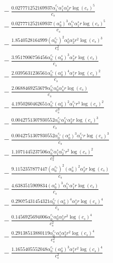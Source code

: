 \documentclass[10pt]{article}
\begin{document}
\begin{align*}
&{}  - \frac{0.027771252169937 \alpha_{1}^{c_s} \alpha_{1}^s \alpha_{2}^s r \log{\left(c_{s} \right)}^{5}}{c_{s}} \\
&{}  - \frac{0.027771252169937 \left(\alpha_{0}^s\right)^{3} \alpha_{1}^{c_s} \alpha_{1}^s r \log{\left(c_{s} \right)}^{5}}{c_{s}} \\
&{}  - \frac{1.8540528164999 \left(\alpha_{0}^{c_s}\right)^{2} \alpha_{0}^s \alpha_{2}^s r^{2} \log{\left(c_{s} \right)}^{3}}{c_{s}^{2}} \\
&{}  - \frac{3.9517006756456 \alpha_{0}^{c_s} \left(\alpha_{0}^s\right)^{3} \alpha_{2}^s r \log{\left(c_{s} \right)}}{c_{s}} \\
&{}  - \frac{2.0395631236561 \alpha_{0}^{c_s} \left(\alpha_{0}^s\right)^{4} \alpha_{1}^s r \log{\left(c_{s} \right)}^{2}}{c_{s}} \\
&{}  - \frac{2.0688469253679 \alpha_{0}^{c_s} \alpha_{0}^s \alpha_{4}^s r \log{\left(c_{s} \right)}}{c_{s}} \\
&{}  - \frac{4.1950260462651 \alpha_{0}^{c_s} \left(\alpha_{0}^s\right)^{2} \alpha_{1}^{c_s} r^{3} \log{\left(c_{s} \right)}^{2}}{c_{s}^{3}} \\
&{}  - \frac{0.0042751307930552 \alpha_{0}^{c_s} \alpha_{2}^{c_s} \alpha_{2}^s r \log{\left(c_{s} \right)}^{3}}{c_{s}} \\
&{}  - \frac{0.0042751307930552 \alpha_{0}^{c_s} \left(\alpha_{0}^s\right)^{3} \alpha_{2}^{c_s} r \log{\left(c_{s} \right)}^{3}}{c_{s}} \\
&{}  - \frac{1.1071445237506 \alpha_{0}^{c_s} \alpha_{1}^s \alpha_{2}^{c_s} r^{2} \log{\left(c_{s} \right)}^{2}}{c_{s}^{2}} \\
&{}  - \frac{9.1152357877447 \left(\alpha_{0}^{c_s}\right)^{2} \left(\alpha_{0}^s\right)^{2} \alpha_{2}^s r \log{\left(c_{s} \right)}}{c_{s}} \\
&{}  - \frac{4.6383515909834 \left(\alpha_{0}^s\right)^{3} \alpha_{1}^{c_s} \alpha_{1}^s r \log{\left(c_{s} \right)}}{c_{s}} \\
&{}  - \frac{0.29075431454321 \alpha_{0}^{c_s} \left(\alpha_{0}^s\right)^{4} \alpha_{1}^s r \log{\left(c_{s} \right)}^{4}}{c_{s}} \\
&{}  - \frac{0.1456925694006 \alpha_{0}^{c_s} \alpha_{0}^s \alpha_{3}^s r^{2} \log{\left(c_{s} \right)}^{4}}{c_{s}^{2}} \\
&{}  - \frac{0.29138513880119 \alpha_{0}^{c_s} \alpha_{1}^s \alpha_{2}^s r^{2} \log{\left(c_{s} \right)}^{4}}{c_{s}^{2}} \\
&{}  - \frac{1.1655405552048 \alpha_{0}^{c_s} \left(\alpha_{0}^s\right)^{3} \alpha_{1}^s r^{2} \log{\left(c_{s} \right)}^{4}}{c_{s}^{2}} \\

\end{align*}
\end{document}
